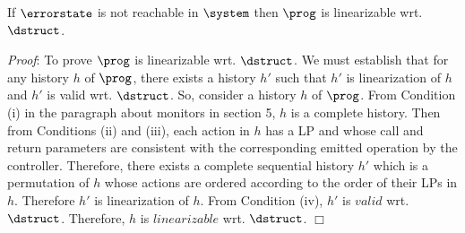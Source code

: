\begin{theorem}
\label{thm:soundness}
If $\errorstate$ is not reachable in  $\system$ 
then $\prog$ is linearizable wrt. $\dstruct$.
\end{theorem}
\label{Proof}
\textit{Proof}: To prove $\prog$ is linearizable wrt. $\dstruct$. We must establish that for any history $h$ of $\prog$, there exists a history $h'$ such that $h'$ is linearization of $h$ and $h'$ is valid wrt. $\dstruct$. So, consider a history $h$ of $\prog$. From Condition (i) in the paragraph about monitors in section 5, $h$ is a complete history. Then from Conditions (ii) and (iii), each action in $h$ has a LP and whose call and return parameters are consistent with the corresponding emitted operation by the controller. Therefore, there exists a complete sequential history $h'$ which is a permutation of $h$ whose actions are ordered according to the order of their LPs in $h$. Therefore $h'$ is linearization of $h$. From Condition (iv), $h'$ is $valid$ wrt. $\dstruct$. Therefore, $h$ is $linearizable$ wrt. $\dstruct$. $\Box$




